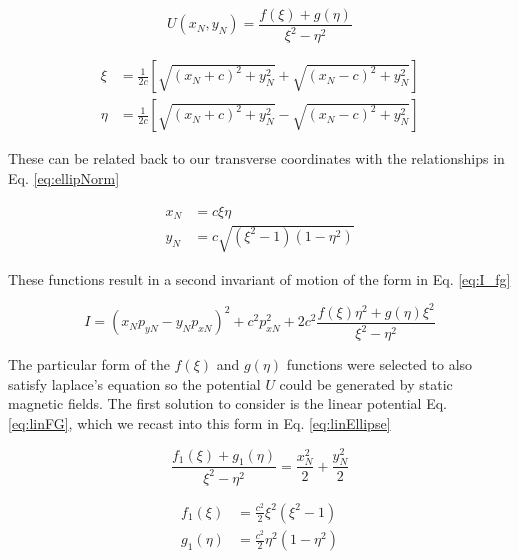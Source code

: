 \begin{equation} \label{eq:darbrouxSol}
	U(x_N,y_N) = \frac{f(\xi) + g(\eta)}{\xi^2 - \eta^2}
\end{equation}

\begin{equation} \label{eq:ellipCoords}
\begin{split}
	\xi &= \frac{1}{2c}\left[ \sqrt{(x_N+c)^2 + y_N^2} + \sqrt{(x_N-c)^2 + y_N^2} \right] \\
	\eta &= \frac{1}{2c}\left[ \sqrt{(x_N+c)^2 + y_N^2} - \sqrt{(x_N-c)^2 + y_N^2} \right]
\end{split}
\end{equation}

These can be related back to our transverse coordinates with the relationships in Eq. \ref{eq:ellipNorm}

\begin{equation} \label{eq:ellipNorm}
\begin{split}
	x_N &= c\xi\eta \\
	y_N &= c \sqrt{(\xi^2-1)(1-\eta^2)}
\end{split}
\end{equation}

These functions result in a second invariant of motion of the form in Eq. \ref{eq:I_fg}

\begin{equation} \label{eq:I_fg}
	I = (x_N p_{yN} - y_N p_{xN})^2 + c^2 p_{xN}^2 + 2c^2 \frac{f(\xi)\eta^2 + g(\eta)\xi^2}{\xi^2 - \eta^2}
\end{equation}

The particular form of the $f(\xi)$ and $g(\eta)$ functions were selected to also satisfy laplace's equation so the potential $U$ could be generated by static magnetic fields. The first solution to consider is the linear potential Eq. \ref{eq:linFG}, which we recast into this form in Eq. \ref{eq:linEllipse}

\begin{equation} \label{eq:linFG}
	\frac{f_1(\xi) + g_1(\eta)}{\xi^2 - \eta^2} = \frac{x_N^2}{2} + \frac{y_N^2}{2}
\end{equation}

\begin{equation} \label{eq:linEllipse}
\begin{split}
	f_1(\xi) &= \frac{c^2}{2}\xi^2(\xi^2-1)\\
	g_1(\eta) &= \frac{c^2}{2}\eta^2(1 - \eta^2)
\end{split}
\end{equation}

